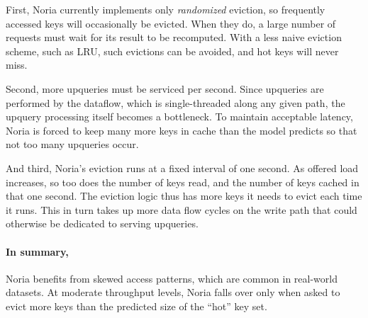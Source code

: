 First, Noria currently implements only \emph{randomized} eviction, so frequently
accessed keys will occasionally be evicted. When they do, a large number of
requests must wait for its result to be recomputed. With a less naive eviction
scheme, such as LRU, such evictions can be avoided, and hot keys will never
miss.

Second, more upqueries must be serviced per second. Since upqueries are
performed by the dataflow, which is single-threaded along any given path, the
upquery processing itself becomes a bottleneck. To maintain acceptable latency,
Noria is forced to keep many more keys in cache than the model predicts so that
not too many upqueries occur.

And third, Noria's eviction runs at a fixed interval of one second. As offered
load increases, so too does the number of keys read, and the number of keys
cached in that one second. The eviction logic thus has more keys it needs to
evict each time it runs. This in turn takes up more data flow cycles on the
write path that could otherwise be dedicated to serving upqueries.

\paragraph{In summary,} Noria benefits from skewed access patterns, which are
common in real-world datasets. At moderate throughput levels, Noria
falls over only when asked to evict more keys than the predicted size of the
``hot'' key set.
